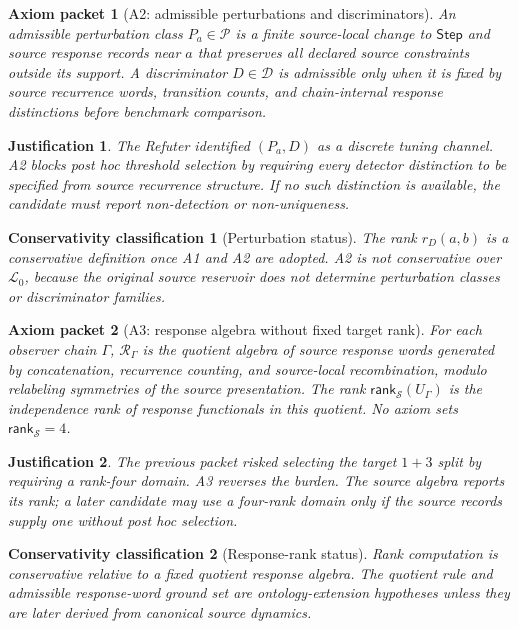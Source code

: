 \documentclass[11pt]{article}
\newcommand{\Step}{\mathsf{Step}}
\newcommand{\RespAlg}{\mathcal{R}_{\Gamma}}
\newcommand{\Rank}{\mathsf{rank}_{\mathcal{S}}}
\newcommand{\Lang}{\mathcal{L}_{0}}
\newtheorem{axiompacket}{Axiom packet}
\newtheorem{justification}{Justification}
\newtheorem{classification}{Conservativity classification}
\begin{document}
\begin{axiompacket}[A2: admissible perturbations and discriminators]
An admissible perturbation class \(P_a\in\mathcal{P}\) is a finite
source-local change to \(\Step\) and source response records near \(a\) that
preserves all declared source constraints outside its support. A discriminator
\(D\in\mathcal{D}\) is admissible only when it is fixed by source recurrence
words, transition counts, and chain-internal response distinctions before
benchmark comparison.
\end{axiompacket}

\begin{justification}
The Refuter identified \((P_a,D)\) as a discrete tuning channel. A2 blocks
post hoc threshold selection by requiring every detector distinction to be
specified from source recurrence structure. If no such distinction is
available, the candidate must report non-detection or non-uniqueness.
\end{justification}

\begin{classification}[Perturbation status]
The rank \(r_D(a,b)\) is a conservative definition once A1 and A2 are adopted.
A2 is not conservative over \(\Lang\), because the original source reservoir
does not determine perturbation classes or discriminator families.
\end{classification}

\begin{axiompacket}[A3: response algebra without fixed target rank]
For each observer chain \(\Gamma\), \(\RespAlg\) is the quotient algebra of
source response words generated by concatenation, recurrence counting, and
source-local recombination, modulo relabeling symmetries of the source
presentation. The rank \(\Rank(U_{\Gamma})\) is the independence rank of
response functionals in this quotient. No axiom sets \(\Rank=4\).
\end{axiompacket}

\begin{justification}
The previous packet risked selecting the target \(1+3\) split by requiring a
rank-four domain. A3 reverses the burden. The source algebra reports its rank;
a later candidate may use a four-rank domain only if the source records supply
one without post hoc selection.
\end{justification}

\begin{classification}[Response-rank status]
Rank computation is conservative relative to a fixed quotient response
algebra. The quotient rule and admissible response-word ground set are
ontology-extension hypotheses unless they are later derived from canonical
source dynamics.
\end{classification}
\end{document}
